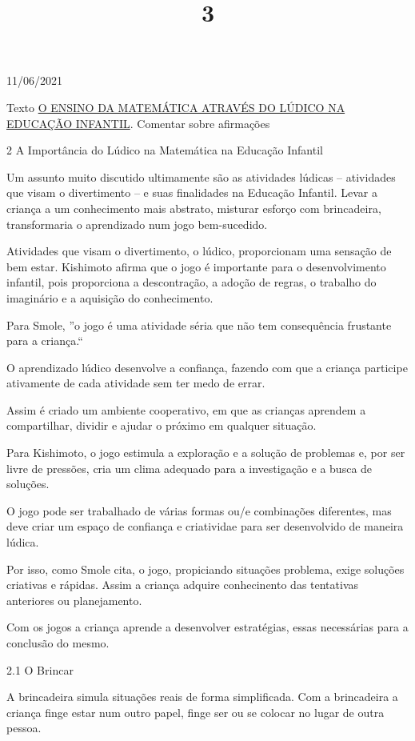 \documentclass{SchoolBook}
\begin{document}
    \begin{day}{11/06/2021}
        \title{3}{Texto \href{https://drive.google.com/file/d/167RWN6Z-7H5BkAholpEdeZX116oSQB6u/view}{O ENSINO DA MATEMÁTICA ATRAVÉS DO LÚDICO NA EDUCAÇÃO INFANTIL}. Comentar sobre afirmações}
        
        2 A Importância do Lúdico na Matemática na Educação Infantil
        
        Um assunto muito discutido ultimamente são as atividades lúdicas -- atividades que visam o divertimento -- e suas finalidades na Educação Infantil. Levar a criança a um conhecimento mais abstrato, misturar esforço com brincadeira, transformaria o aprendizado num jogo bem-sucedido.
        
        Atividades que visam o divertimento, o lúdico, proporcionam uma sensação de bem estar. Kishimoto afirma que o jogo é importante para o desenvolvimento infantil, pois proporciona a descontração, a adoção de regras, o trabalho do imaginário e a aquisição do conhecimento.
        
        Para Smole, ''o jogo é uma atividade séria que não tem consequência frustante para a criança.``
        
        O aprendizado lúdico desenvolve a confiança, fazendo com que a criança participe ativamente de cada atividade sem ter medo de errar.
        
        Assim é criado um ambiente cooperativo, em que as crianças aprendem a compartilhar, dividir e ajudar o próximo em qualquer situação.
        
        Para Kishimoto, o jogo estimula a exploração e a solução de problemas e, por ser livre de pressões, cria um clima adequado para a investigação e a busca de soluções.
        
        O jogo pode ser trabalhado de várias formas ou/e combinações diferentes, mas deve criar um espaço de confiança e criatividae para ser desenvolvido de maneira lúdica.
        
        Por isso, como Smole cita, o jogo, propiciando situações problema, exige soluções criativas e rápidas. Assim a criança adquire conhecinento das tentativas anteriores ou planejamento.
        
        Com os jogos a criança aprende a desenvolver estratégias, essas necessárias para a conclusão do mesmo.
        
        2.1 O Brincar
        
        A brincadeira simula situações reais de forma simplificada. Com a brincadeira a criança finge estar num outro papel, finge ser ou se colocar no lugar de outra pessoa.
        

\end{day}
\end{document}
